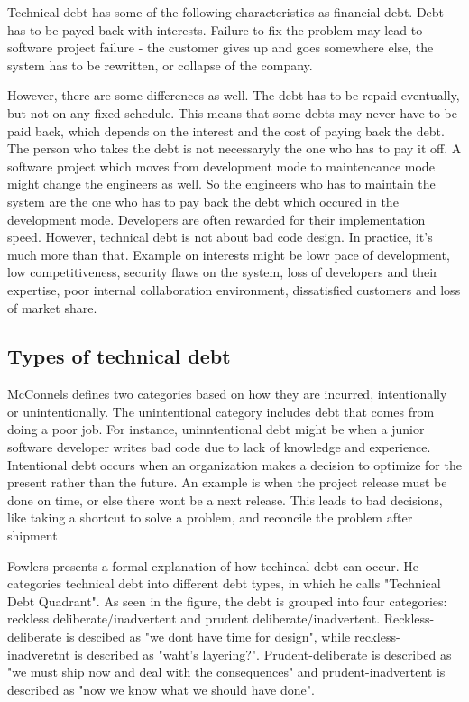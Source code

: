 Technical debt has some of the following characteristics as financial debt. Debt has to be payed back with interests. Failure to fix the problem may lead to software project failure - the customer gives up and goes somewhere else, the system has to be rewritten, or collapse of the company. 

However, there are some differences as well. The debt has to be repaid eventually, but not on any fixed schedule. This means that some debts may never have to be paid back, which depends on the interest and the cost of paying back the debt. The person who takes the debt is not necessaryly the one who has to pay it off. A software project which moves from development mode to maintencance mode might change the engineers as well. So the engineers who has to maintain the system are the one who has to pay back the debt which occured in the development mode. Developers are often rewarded for their implementation speed. However, technical debt is not about bad code design. In practice, it's much more than that. Example on interests might be lowr pace of development, low competitiveness, security flaws on the system, loss of developers and their expertise, poor internal collaboration environment, dissatisfied customers and loss of market share. 



\subsection{Types of technical debt}

McConnels defines two categories based on how they are incurred, intentionally or unintentionally. The unintentional category includes debt that comes from doing a poor job. For instance, uninntentional debt might be when a junior software developer writes bad code due to lack of knowledge and experience. Intentional debt occurs when an organization makes a decision to optimize for the present rather than the future. An example is when the project release must be done on time, or else there wont be a next release. This leads to bad decisions, like taking a shortcut to solve a problem, and reconcile the problem after shipment

Fowlers presents a formal explanation of how techincal debt can occur. He categories technical debt into different debt types, in which he calls "Technical Debt Quadrant". As seen in the figure, the debt is grouped into four categories: reckless deliberate/inadvertent and prudent deliberate/inadvertent. Reckless-deliberate is descibed as "we dont have time for design", while reckless-inadveretnt is described as "waht's layering?". Prudent-deliberate is described as "we must ship now and deal with the consequences" and prudent-inadvertent is described as "now we know what we should have done". 

